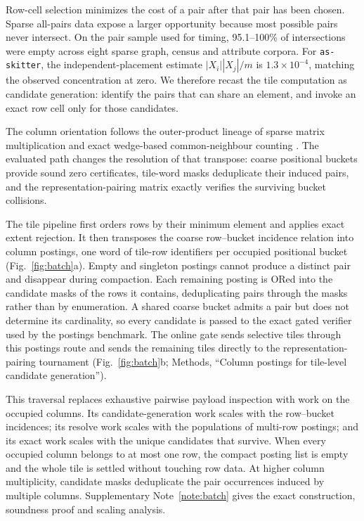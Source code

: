Row-cell selection minimizes the cost of a pair after that pair has been chosen. Sparse all-pairs
data expose a larger opportunity because most possible pairs never intersect. On the pair sample
used for timing, 95.1--100\% of intersections were empty across eight sparse graph, census and
attribute corpora. For \texttt{as-skitter}, the independent-placement estimate
$|X_i||X_j|/m$ is $1.3\times10^{-4}$, matching the observed concentration at zero. We therefore
recast the tile computation as candidate generation: identify the pairs that can share an element,
and invoke an exact row cell only for those candidates.

The column orientation follows the outer-product lineage of sparse matrix multiplication
\cite{gustavson1978spgemm,buluc2011combinatorialblas} and exact wedge-based common-neighbour counting
\cite{an2019skipintersection}. The evaluated path changes the resolution of that transpose: coarse
positional buckets provide sound zero certificates, tile-word masks deduplicate their induced pairs,
and the representation-pairing matrix exactly verifies the surviving bucket collisions.

The tile pipeline first orders rows by their minimum element and applies exact extent rejection. It
then transposes the coarse row--bucket incidence relation into column postings, one word of tile-row
identifiers per occupied positional bucket (Fig.~\ref{fig:batch}a). Empty and singleton postings
cannot produce a distinct pair and disappear during compaction. Each remaining posting is ORed into
the candidate masks of the rows it contains, deduplicating pairs through the masks rather than by
enumeration. A shared coarse bucket admits a pair but does not determine its cardinality, so every
candidate is passed to the exact gated \cell{\rB}{\rS} verifier used by the postings benchmark. The
online gate sends selective tiles through
this postings route and sends the remaining tiles directly to the representation-pairing tournament
(Fig.~\ref{fig:batch}b; Methods, ``Column postings for tile-level candidate generation'').

This traversal replaces exhaustive pairwise payload inspection with work on the occupied columns.
Its candidate-generation work scales with the row--bucket incidences; its resolve work scales with the
populations of multi-row postings; and its exact work scales with the unique candidates that survive.
When every occupied column belongs to at most one row, the compact posting list is empty and the
whole tile is settled without touching row data. At higher column multiplicity, candidate masks
deduplicate the pair occurrences induced by multiple columns. Supplementary Note~\ref{note:batch}
gives the exact construction, soundness proof and scaling analysis.

